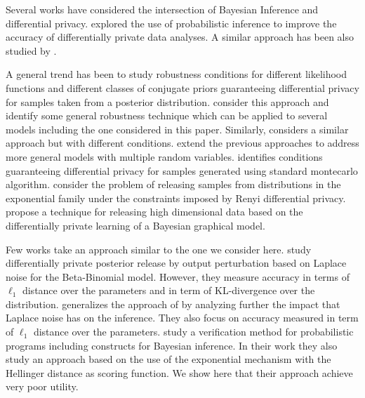 \documentclass{article}
\begin{document}

Several works have considered the intersection of Bayesian Inference and differential
privacy. \citet{williams2010probabilistic} explored the use of
probabilistic inference to improve the accuracy of differentially
private data analyses. A similar approach has been also studied by
\citet{xiao2012bayesian}.


A general trend has been to study robustness conditions
for different likelihood functions and different classes of conjugate priors 
guaranteeing differential privacy for samples taken from a
posterior distribution. \citet{dimitrakakis2014robust}
consider this approach and identify some general robustness technique
which can be applied to several models including the one considered in
this paper. Similarly, \citet{zheng2015differential} considers a similar approach
but with different conditions. \citet{zhang2016differential} extend
the previous approaches to address more general models with multiple
random variables. 
\citet{wang2015privacy} identifies
conditions guaranteeing differential privacy for samples generated
using standard montecarlo algorithm.
\citet{GeumlekSC17} consider the problem of releasing samples from
distributions in the exponential family under the constraints imposed
by Renyi differential privacy. 
\citet{Zhang2017privbayes} propose a technique for releasing high
dimensional data based on the differentially private learning of a
Bayesian graphical model. 

Few works take an approach similar to the one we consider here. 
\citet{dimitrakakis2015differential} study differentially private
posterior release by output perturbation based on Laplace noise for the Beta-Binomial
model. However, they measure accuracy in terms of $\ell_1$
distance over the parameters and in term of KL-divergence over the distribution.  \citet{foulds2016theory}
generalizes the approach of \citet{dimitrakakis2015differential} by
analyzing further the impact that Laplace noise has on the inference.
They also focus on accuracy measured in term of  $\ell_1$ distance
over the parameters. \citet{BartheFGAGHS16} study a verification
method for probabilistic programs including constructs for Bayesian
inference. In their work they also study an approach based on the use
of the exponential mechanism with the Hellinger distance as scoring
function. We show here that their approach achieve very poor utility. 
\end{document}
